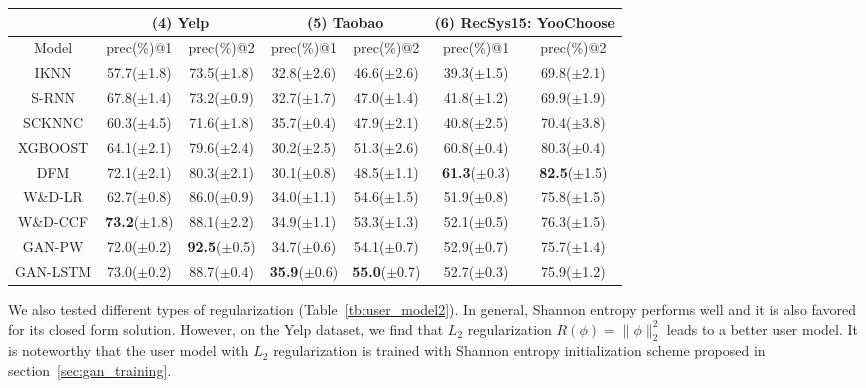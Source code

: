\documentclass{article} %
\begin{document}
\begin{table}[ht!]
\begin{center}
{\begin{tabular}{c|cc|cc|cc}
\hline 
\hline
& \multicolumn{2}{|c}{(4) Yelp} & \multicolumn{2}{|c}{(5) Taobao } & \multicolumn{2}{|c}{(6) RecSys15: YooChoose} \\
\hline 
Model  & prec(\%)@1 & prec(\%)@2 & prec(\%)@1 & prec(\%)@2 & prec(\%)@1 & prec(\%)@2
\\
\hline
IKNN & 57.7($\pm$1.8) & 73.5($\pm$1.8) & 32.8($\pm$2.6) & 46.6($\pm$2.6) & 39.3($\pm$1.5) & 69.8($\pm$2.1)\\
S-RNN & 67.8($\pm$1.4) & 73.2($\pm$0.9) & 32.7($\pm$1.7) & 47.0($\pm$1.4) & 41.8($\pm$1.2) & 69.9($\pm$1.9)\\
SCKNNC & 60.3($\pm$4.5) & 71.6($\pm$1.8) & 35.7($\pm$0.4) & 47.9($\pm$2.1) & 40.8($\pm$2.5) & 70.4($\pm$3.8)\\
XGBOOST & 64.1($\pm$2.1) & 79.6($\pm$2.4) & 30.2($\pm$2.5) & { 51.3($\pm$2.6)}  & { 60.8}($\pm$0.4) & {80.3}($\pm$0.4)\\
DFM & 72.1($\pm$2.1) & 80.3($\pm$2.1) & 30.1($\pm$0.8) & { 48.5($\pm$1.1)}  & {\bf 61.3}($\pm$0.3) & {\bf 82.5}($\pm$1.5)\\
W\&D-LR  & 62.7($\pm$0.8) & 86.0($\pm$0.9) &  34.0($\pm$1.1) & 54.6($\pm$1.5)   & 51.9($\pm$0.8) & 75.8($\pm$1.5) \\
W\&D-CCF & {\bf 73.2}($\pm$1.8) & 88.1($\pm$2.2) & 34.9($\pm$1.1) & 53.3($\pm$1.3) & 52.1($\pm$0.5) & 76.3($\pm$1.5) \\
\hline
{\small GAN-PW} &72.0($\pm$0.2) & {\bf 92.5}($\pm$0.5)  & {34.7}($\pm$0.6) & {54.1}($\pm$0.7) & {52.9($\pm$0.7)}  & {75.7($\pm$1.4)}\\
{\small GAN-LSTM} & {73.0}($\pm$0.2) & 88.7($\pm$0.4) & {\bf 35.9}($\pm$0.6)  & {\bf 55.0}($\pm$0.7) & {52.7($\pm$0.3)} & {75.9($\pm$1.2)}\\
\hline
\end{tabular}}
\end{center}
\vspace{-4mm}
\end{table}

We also tested different types of regularization (Table~\ref{tb:user_model2}). In general, Shannon entropy performs well and it is also favored for its closed form solution. However, on the Yelp dataset, we find that $L_2$ regularization $R(\phi) = \|\phi\|_2^2$ leads to a better user model. It is noteworthy that the user model with $L_2$ regularization is trained with Shannon entropy initialization scheme proposed in section~\ref{sec:gan_training}. 
\end{document}
